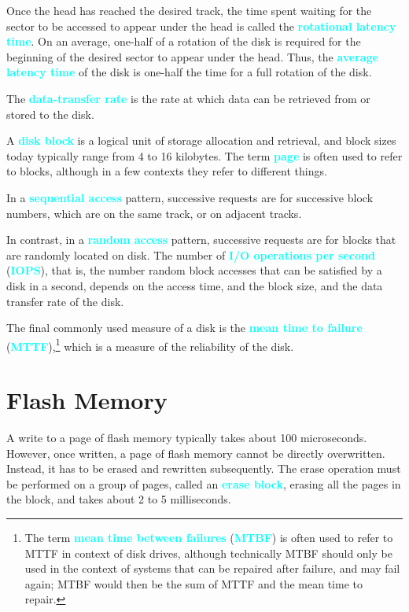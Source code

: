 \documentclass[a4paper,12pt,twoside,openany]{book}
\newcommand{\textcy}[1]{\textbf{\textcolor{cyan}{#1}}}
\begin{document}
Once the head has reached the desired track, the time spent waiting for the sector to be accessed to appear under the head is called the \textcy{rotational latency time}. On an average, one-half of a rotation of the disk is required for the beginning of the desired sector to appear under the head. Thus, the \textcy{average latency time} of the disk is one-half the time for a full rotation of the disk.

The \textcy{data-transfer rate} is the rate at which data can be retrieved from or stored to the disk.

A \textcy{disk block} is a logical unit of storage allocation and retrieval, and block sizes today typically range from 4 to 16 kilobytes. The term \textcy{page} is often used to refer to blocks, although in a few contexts they refer to different things.

In a \textcy{sequential access} pattern, successive requests are for successive block numbers, which are on the same track, or on adjacent tracks.

In contrast, in a \textcy{random access} pattern, successive requests are for blocks that are randomly located on disk. The number of \textcy{I/O operations per second} (\textcy{IOPS}), that is, the number random block accesses that can be satisfied by a disk in a second, depends on the access time, and the block size, and the data transfer rate of the disk.

The final commonly used measure of a disk is the \textcy{mean time to failure} (\textcy{MTTF}),\footnote{The term \textcy{mean time between failures} (\textcy{MTBF}) is often used to refer to MTTF in context of disk drives, although technically MTBF should only be used in the context of systems that can be repaired after failure, and may fail again; MTBF would then be the sum of MTTF and the mean time to repair.} which is a measure of the reliability of the disk.

\section{Flash Memory}

A write to a page of flash memory typically takes about 100 microseconds. However, once written, a page of flash memory cannot be directly overwritten. Instead, it has to be erased and rewritten subsequently. The erase operation must be performed on a group of pages, called an \textcy{erase block}, erasing all the pages in the block, and takes about 2 to 5 milliseconds.
\end{document}
